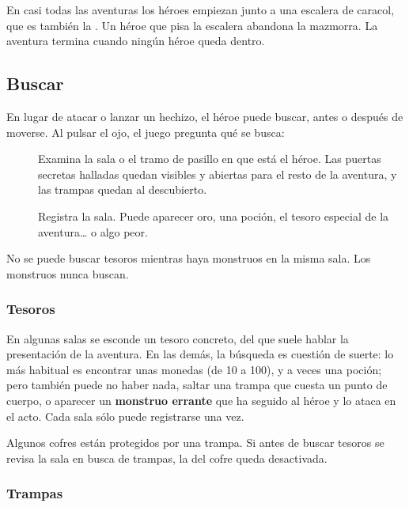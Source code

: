 En casi todas las aventuras los héroes empiezan junto a una escalera de
caracol, que es también la . Un héroe que pisa la escalera
abandona la mazmorra. La aventura termina cuando ningún héroe queda dentro.


\subsection{Buscar}

En lugar de atacar o lanzar un hechizo, el héroe puede buscar, antes o
después de moverse. Al pulsar el ojo, el juego pregunta qué se busca:


\begin{description}
\item[] Examina la sala o el tramo de pasillo
  en que está el héroe. Las puertas secretas halladas quedan visibles y
  abiertas para el resto de la aventura, y las trampas quedan al
  descubierto.
\item[] Registra la sala. Puede aparecer oro, una
  poción, el tesoro especial de la aventura\ldots{} o algo peor.
\end{description}

No se puede buscar tesoros mientras haya monstruos en la misma sala.
Los monstruos nunca buscan.

\subsubsection*{Tesoros}

En algunas salas se esconde un tesoro concreto, del que suele hablar la
presentación de la aventura. En las demás, la búsqueda es cuestión de
suerte: lo más habitual es encontrar unas monedas (de 10 a 100), y a veces
una poción; pero también puede no haber nada, saltar una trampa que cuesta
un punto de cuerpo, o aparecer un \textbf{monstruo errante} que ha seguido
al héroe y lo ataca en el acto. Cada sala sólo puede registrarse una vez.

Algunos cofres están protegidos por una trampa. Si antes de buscar tesoros
se revisa la sala en busca de trampas, la del cofre queda desactivada.

\subsubsection*{Trampas}

